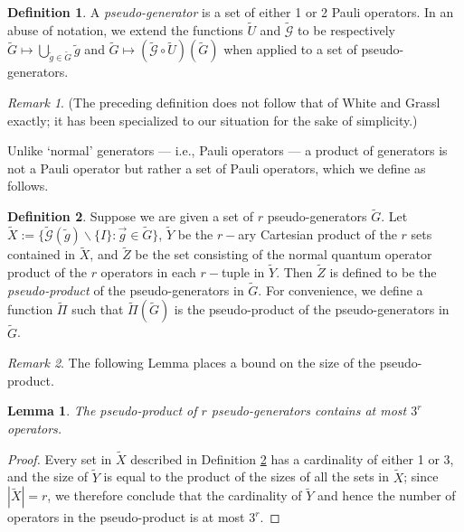 \documentclass[12pt]{amsbook}
\theoremstyle{plain}
\newtheorem{lemma}{Lemma}
\theoremstyle{definition}
\newtheorem{definition}{Definition}
\theoremstyle{remark}
\newtheorem{remark}{Remark}
\newcommand{\lst}{\vec}
\newcommand{\set}{\tilde}
\newcommand{\genfun}{\tilde{\mathcal{G}}}
\newcommand{\pseudoproduct}{\set\Pi}
\begin{document}
\begin{definition}
A \emph{pseudo-generator} is a set of either 1 or 2 Pauli operators.  In an abuse of notation, we extend the functions $\set U$ and $\genfun$ to be respectively $\set G\mapsto \bigcup_{\set g\in\set G} \set g$ and $\set G\mapsto (\genfun\circ\set U)(\set G)$ when applied to a set of pseudo-generators.
\end{definition}
\begin{remark}
(The preceding definition does not follow that of White and Grassl exactly; it has been specialized to our situation for the sake of simplicity.)

Unlike `normal' generators --- i.e., Pauli operators --- a product of generators is not a Pauli operator but rather a set of Pauli operators, which we define as follows.
\end{remark}

\begin{definition}
\label{definition:pseudo-product}
Suppose we are given a set of $r$ pseudo-generators $\set G$.  Let $\set X:=\{\genfun(\set g)\backslash\{I\}: \lst g\in\set G\}$, $\set Y$ be the $r-$ary Cartesian product of the $r$ sets contained in $\set X$, and $\set Z$ be the set consisting of the normal quantum operator product of the $r$ operators in each $r-$tuple in $\set Y$.  Then $\set Z$ is defined to be the \emph{pseudo-product} of the pseudo-generators in $\set G$.  For convenience, we define a function $\pseudoproduct$ such that $\pseudoproduct(\set G)$ is the pseudo-product of the pseudo-generators in $\set G$.
\end{definition}

\begin{remark}
The following Lemma places a bound on the size of the pseudo-product.
\end{remark}

\begin{lemma}
\label{lemma:bound-on-pseudo-product}
The pseudo-product of $r$ pseudo-generators contains at most $3^r$ operators.
\end{lemma}

\begin{proof}
Every set in $\set X$ described in Definition \ref{definition:pseudo-product} has a cardinality of either 1 or 3, and the size of $\set Y$ is equal to the product of the sizes of all the sets in $\set X$;  since $|\set X|=r$, we therefore conclude that the cardinality of $\set Y$ and hence the number of operators in the pseudo-product is at most $3^r$.
\end{proof}
\end{document}

